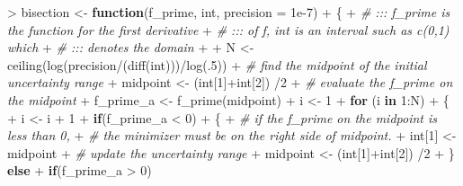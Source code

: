 \documentclass[
]{article}
\newenvironment{Shaded}{\begin{snugshade}}{\end{snugshade}}
\newcommand{\AttributeTok}[1]{\textcolor[rgb]{0.77,0.63,0.00}{#1}}
\newcommand{\CommentTok}[1]{\textcolor[rgb]{0.56,0.35,0.01}{\textit{#1}}}
\newcommand{\ControlFlowTok}[1]{\textcolor[rgb]{0.13,0.29,0.53}{\textbf{#1}}}
\newcommand{\DecValTok}[1]{\textcolor[rgb]{0.00,0.00,0.81}{#1}}
\newcommand{\FloatTok}[1]{\textcolor[rgb]{0.00,0.00,0.81}{#1}}
\newcommand{\FunctionTok}[1]{\textcolor[rgb]{0.00,0.00,0.00}{#1}}
\newcommand{\NormalTok}[1]{#1}
\newcommand{\OtherTok}[1]{\textcolor[rgb]{0.56,0.35,0.01}{#1}}
\newcommand{\SpecialCharTok}[1]{\textcolor[rgb]{0.00,0.00,0.00}{#1}}
\begin{document}
\begin{Shaded}
\begin{Highlighting}[]
\SpecialCharTok{\textgreater{}}\NormalTok{ bisection }\OtherTok{\textless{}{-}} \ControlFlowTok{function}\NormalTok{(f\_prime, int, }\AttributeTok{precision =} \FloatTok{1e{-}7}\NormalTok{)}
\SpecialCharTok{+}\NormalTok{ \{}
\SpecialCharTok{+}   \CommentTok{\# ::: f\_prime is the function for the first derivative}
\SpecialCharTok{+}   \CommentTok{\# ::: of f, int is an interval such as c(0,1) which }
\SpecialCharTok{+}   \CommentTok{\# ::: denotes the domain}
\SpecialCharTok{+}   
\SpecialCharTok{+}\NormalTok{   N }\OtherTok{\textless{}{-}} \FunctionTok{ceiling}\NormalTok{(}\FunctionTok{log}\NormalTok{(precision}\SpecialCharTok{/}\NormalTok{(}\FunctionTok{diff}\NormalTok{(int)))}\SpecialCharTok{/}\FunctionTok{log}\NormalTok{(.}\DecValTok{5}\NormalTok{))}
\SpecialCharTok{+}   \CommentTok{\# find the midpoint of the initial uncertainty range}
\SpecialCharTok{+}\NormalTok{   midpoint }\OtherTok{\textless{}{-}}\NormalTok{ (int[}\DecValTok{1}\NormalTok{]}\SpecialCharTok{+}\NormalTok{int[}\DecValTok{2}\NormalTok{]) }\SpecialCharTok{/}\DecValTok{2}
\SpecialCharTok{+}   \CommentTok{\# evaluate the f\_prime on the midpoint}
\SpecialCharTok{+}\NormalTok{   f\_prime\_a }\OtherTok{\textless{}{-}} \FunctionTok{f\_prime}\NormalTok{(midpoint)}
\SpecialCharTok{+}\NormalTok{   i }\OtherTok{\textless{}{-}} \DecValTok{1}
\SpecialCharTok{+}   \ControlFlowTok{for}\NormalTok{ (i }\ControlFlowTok{in} \DecValTok{1}\SpecialCharTok{:}\NormalTok{N)}
\SpecialCharTok{+}\NormalTok{   \{}
\SpecialCharTok{+}\NormalTok{     i }\OtherTok{\textless{}{-}}\NormalTok{ i }\SpecialCharTok{+} \DecValTok{1}
\SpecialCharTok{+}     \ControlFlowTok{if}\NormalTok{(f\_prime\_a }\SpecialCharTok{\textless{}} \DecValTok{0}\NormalTok{)}
\SpecialCharTok{+}\NormalTok{     \{}
\SpecialCharTok{+}       \CommentTok{\# if the f\_prime on the midpoint is less than 0,}
\SpecialCharTok{+}       \CommentTok{\# the minimizer must be on the right side of midpoint.}
\SpecialCharTok{+}\NormalTok{       int[}\DecValTok{1}\NormalTok{] }\OtherTok{\textless{}{-}}\NormalTok{ midpoint}
\SpecialCharTok{+}       \CommentTok{\# update the uncertainty range}
\SpecialCharTok{+}\NormalTok{       midpoint }\OtherTok{\textless{}{-}}\NormalTok{ (int[}\DecValTok{1}\NormalTok{]}\SpecialCharTok{+}\NormalTok{int[}\DecValTok{2}\NormalTok{]) }\SpecialCharTok{/}\DecValTok{2}
\SpecialCharTok{+}\NormalTok{     \} }\ControlFlowTok{else}
\SpecialCharTok{+}       \ControlFlowTok{if}\NormalTok{(f\_prime\_a }\SpecialCharTok{\textgreater{}} \DecValTok{0}\NormalTok{)}

\end{Highlighting}
\end{Shaded}
\end{document}
